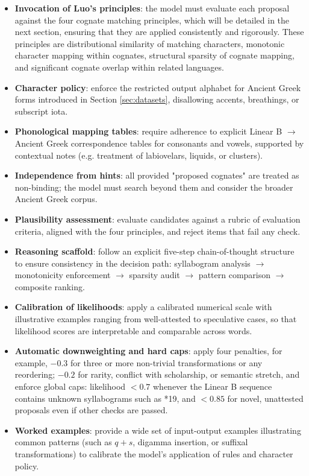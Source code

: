 \begin{itemize}[leftmargin=2em]
  \item \textbf{Invocation of Luo's principles}: the model must evaluate each proposal against the four cognate matching principles, which will be detailed in the next section, ensuring that they are applied consistently and rigorously.
  These principles are distributional similarity of matching characters, monotonic character mapping within cognates, structural sparsity of cognate mapping, and significant cognate overlap within related languages.
  \item \textbf{Character policy}: enforce the restricted output alphabet for Ancient Greek forms introduced in Section \ref{sec:datasets}, disallowing accents, breathings, or subscript iota.
  \item \textbf{Phonological mapping tables}: require adherence to explicit Linear B $\rightarrow$ Ancient Greek correspondence tables for consonants and vowels, supported by contextual notes (e.g. treatment of labiovelars, liquids, or clusters).
  \item \textbf{Independence from hints}: all provided "proposed cognates" are treated as non-binding; the model must search beyond them and consider the broader Ancient Greek corpus.
  \item \textbf{Plausibility assessment}: evaluate candidates against a rubric of evaluation criteria, aligned with the four principles, and reject items that fail any check.
  \item \textbf{Reasoning scaffold}: follow an explicit five-step chain-of-thought structure to ensure consistency in the decision path: syllabogram analysis $\rightarrow$ monotonicity enforcement $\rightarrow$ sparsity audit $\rightarrow$ pattern comparison $\rightarrow$ composite ranking.
  \item \textbf{Calibration of likelihoods}: apply a calibrated numerical scale with illustrative examples ranging from well-attested to speculative cases, so that likelihood scores are interpretable and comparable across words.
  \item \textbf{Automatic downweighting and hard caps}: apply four penalties, for example, $-0.3$ for three or more non-trivial transformations or any reordering; $-0.2$ for rarity, conflict with scholarship, or semantic stretch, and enforce global caps: likelihood $<0.7$ whenever the Linear B sequence contains unknown syllabograms such as *19, and $<0.85$ for novel, unattested proposals even if other checks are passed.
  \item \textbf{Worked examples}: provide a wide set of input-output examples illustrating common patterns (such as $q{+}s$, digamma insertion, or suffixal transformations) to calibrate the model's application of rules and character policy.

\end{itemize}
